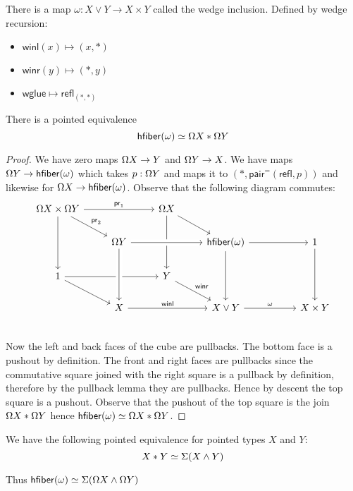 \begin{defin}
    There is a map $\omega : X \vee Y \to X \times Y$ called the wedge inclusion. Defined by wedge recursion:
    \begin{itemize}
        \item $\mathsf{winl}(x) \mapsto (x, *)$
        \item $\mathsf{winr}(y) \mapsto (*, y)$
        \item $\mathsf{wglue} \mapsto \mathsf{refl}_{(*,*)}$
    \end{itemize}
\end{defin}

\begin{lemma}
    There is a pointed equivalence
    \begin{equation*}
        \mathsf{hfiber}(\omega) \simeq \Omega X * \Omega Y
    \end{equation*}
\end{lemma}

\begin{proof}
    We have zero maps $\Omega X \to Y$ and $\Omega Y \to X$. We have maps $\Omega Y \to \mathsf{hfiber}(\omega)$ which takes $p : \Omega Y$ and maps it to $(*, \mathsf{pair}^= (\mathsf{refl}, p))$ and likewise for $\Omega X \to \mathsf{hfiber}(\omega)$.
    Observe that the following diagram commutes:
    \begin{equation*}
        \begin{tikzcd}
            \loops X \times \loops Y \ar[rr, "\pr_1"] \ar[dd] \ar[rd, "\pr_2"] & & \loops X \ar[dd] \ar[rd] \\
            & \loops Y \ar[rr, crossing over] & & \hfiber(\omega) \ar[rr] \ar[dd] & & 1 \ar[dd] \\
            1 \ar[rr] \ar[rd] & & Y \ar[rd, "\mathsf{winr}"] \\
            & X \ar[from=uu, crossing over] \ar[rr, "\mathsf{winl}"] & & X \vee Y \ar[rr, "\omega"] & & X \times Y \\
        \end{tikzcd}
    \end{equation*}
    Now the left and back faces of the cube are pullbacks. The bottom face is a pushout by definition. The front and right faces are pullbacks since the commutative square joined with the right square is a pullback by definition, therefore by the pullback lemma they are pullbacks. Hence by descent the top square is a pushout. Observe that the pushout of the top square is the join $\Omega X * \Omega Y$ hence $\mathsf{hfiber}(\omega) \simeq \Omega X * \Omega Y$.
\end{proof}

\begin{lemma}
    We have the following pointed equivalence for pointed types $X$ and $Y$:
    \begin{equation*}
        X * Y \simeq \Sigma (X \wedge Y)
    \end{equation*}
\end{lemma}

\begin{remark}
    Thus $\mathsf{hfiber}(\omega) \simeq \Sigma (\Omega X \wedge \Omega Y)$
\end{remark}
